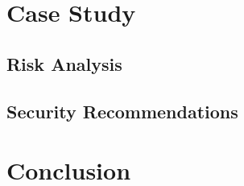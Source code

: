 \documentclass[11pt,a4paper]{article}
\begin{document}
\section{Case Study}

\subsection{Risk Analysis}

\subsection{Security Recommendations}

\section{Conclusion}
\end{document}
